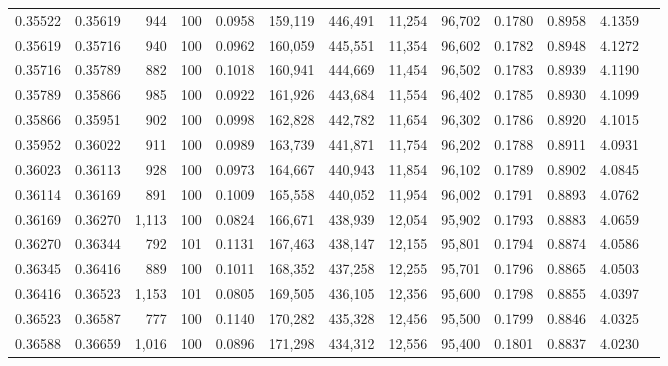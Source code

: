 \begin{tabular}{rrrrrrrrrrrrr}
0.35522 & 0.35619 &   944 & 100 &                                     0.0958 & 159,119 & 446,491 &  11,254 &  96,702 & 0.1780 & 0.8958 & 4.1359 \\
0.35619 & 0.35716 &   940 & 100 &                                     0.0962 & 160,059 & 445,551 &  11,354 &  96,602 & 0.1782 & 0.8948 & 4.1272 \\
0.35716 & 0.35789 &   882 & 100 &                                     0.1018 & 160,941 & 444,669 &  11,454 &  96,502 & 0.1783 & 0.8939 & 4.1190 \\
0.35789 & 0.35866 &   985 & 100 &                                     0.0922 & 161,926 & 443,684 &  11,554 &  96,402 & 0.1785 & 0.8930 & 4.1099 \\
0.35866 & 0.35951 &   902 & 100 &                                     0.0998 & 162,828 & 442,782 &  11,654 &  96,302 & 0.1786 & 0.8920 & 4.1015 \\
0.35952 & 0.36022 &   911 & 100 &                                     0.0989 & 163,739 & 441,871 &  11,754 &  96,202 & 0.1788 & 0.8911 & 4.0931 \\
0.36023 & 0.36113 &   928 & 100 &                                     0.0973 & 164,667 & 440,943 &  11,854 &  96,102 & 0.1789 & 0.8902 & 4.0845 \\
0.36114 & 0.36169 &   891 & 100 &                                     0.1009 & 165,558 & 440,052 &  11,954 &  96,002 & 0.1791 & 0.8893 & 4.0762 \\
0.36169 & 0.36270 & 1,113 & 100 &                                     0.0824 & 166,671 & 438,939 &  12,054 &  95,902 & 0.1793 & 0.8883 & 4.0659 \\
0.36270 & 0.36344 &   792 & 101 &                                     0.1131 & 167,463 & 438,147 &  12,155 &  95,801 & 0.1794 & 0.8874 & 4.0586 \\
0.36345 & 0.36416 &   889 & 100 &                                     0.1011 & 168,352 & 437,258 &  12,255 &  95,701 & 0.1796 & 0.8865 & 4.0503 \\
0.36416 & 0.36523 & 1,153 & 101 &                                     0.0805 & 169,505 & 436,105 &  12,356 &  95,600 & 0.1798 & 0.8855 & 4.0397 \\
0.36523 & 0.36587 &   777 & 100 &                                     0.1140 & 170,282 & 435,328 &  12,456 &  95,500 & 0.1799 & 0.8846 & 4.0325 \\
0.36588 & 0.36659 & 1,016 & 100 &                                     0.0896 & 171,298 & 434,312 &  12,556 &  95,400 & 0.1801 & 0.8837 & 4.0230 \\

\end{tabular}
